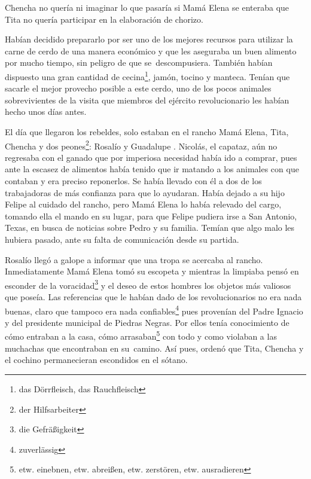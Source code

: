 Chencha no quería ni imaginar lo que pasaría si Mamá Elena se enteraba
que Tita no quería participar en la elaboración de chorizo.

Habían decidido prepararlo por ser uno de los mejores recursos para
utilizar la carne de cerdo de una manera económico y que les aseguraba
un buen alimento por mucho tiempo, sin peligro de que se~descompusiera.
También habían dispuesto una gran cantidad de cecina\footnote{das Dörrfleisch, das Rauchfleisch},
jamón, tocino y manteca. Tenían que sacarle el mejor provecho posible
a este cerdo, uno de los pocos animales sobrevivientes de la visita
que miembros del ejército revolucionario les habían hecho unos días
antes.

El día que llegaron los rebeldes, solo estaban en el rancho Mamá Elena,
Tita, Chencha y dos peones\footnote{der Hilfsarbeiter}: Rosalío y
Guadalupe . Nicolás, el capataz, aún no regresaba con el ganado que por
imperiosa necesidad había ido a comprar, pues ante la escasez de alimentos
había tenido que ir matando a los animales con que contaban y era preciso
reponerlos. Se había llevado con él a dos de los trabajadoras de más
confianza para que lo ayudaran.
Había dejado a su hijo Felipe al cuidado del rancho, pero Mamá Elena lo
había relevado del cargo, tomando ella el mando en su lugar, para que
Felipe pudiera irse a San Antonio, Texas, en busca de noticias sobre
Pedro y su familia. Temían que algo malo les hubiera pasado, ante su
falta de comunicación desde su partida.

Rosalío llegó a galope a informar que una tropa se acercaba al rancho.
Inmediatamente Mamá Elena tomó su escopeta y mientras la limpiaba pensó
en esconder de la voracidad\footnote{die Gefräßigkeit} y el
deseo de estos hombres los objetos más valiosos que poseía. Las referencias
que le habían dado de los revolucionarios no era nada buenas, claro que
tampoco era nada confiables\footnote{zuverlässig} pues provenían
del Padre Ignacio y del presidente municipal de Piedras Negras. Por ellos
tenía conocimiento de cómo entraban a la casa, cómo arrasaban\footnote{etw. einebnen, etw. abreißen, etw. zerstören, etw. ausradieren}
con todo y como violaban a las muchachas que encontraban en su~camino.
Así pues, ordenó que Tita, Chencha y el cochino permanecieran escondidos
en el sótano.

